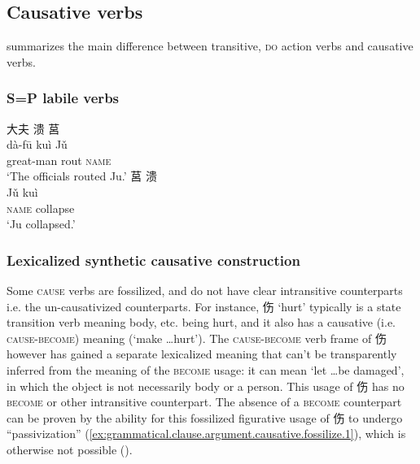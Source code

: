 \documentclass[UTF8, a4paper, oneside, scheme=plain, 12pt]{ctexrep}
\newcommand*{\citepage}[1]{p.~{#1}}
\newcommand{\translate}[1]{`#1'}
\newcommand*{\category}[1]{\textsc{#1}}
\begin{document}
\subsection{Causative verbs}

\citet[\citepage{272}]{meiguang2018} summarizes the main difference between transitive, \category{do} action verbs and causative verbs.

\subsubsection{S=P labile verbs}\label{sec:valency.monotransitive.s-p}

\begin{exe}
    \ex
    \glll 大夫 溃 莒 \\
    dà-fū kuì Jǔ \\
    great-man rout \category{name} \\
    \glt\translate{The officials routed Ju.}
    \ex
    \glll 莒 溃 \\
    Jǔ kuì \\
    \category{name} collapse \\
    \glt\translate{Ju collapsed.}
\end{exe}

\subsubsection{Lexicalized synthetic causative construction}
\label{sec:grammatical.clause.verbal.argument-structure.causative.fossilization}

Some \category{cause} verbs are fossilized,
and do not have clear intransitive counterparts
i.e. the un-causativized counterparts.
For instance, 伤 \translate{hurt} typically is a state transition verb meaning body, etc. being hurt,
and it also has a causative (i.e. \category{cause}-\category{become}) meaning
(\translate{make \dots hurt}).
The \category{cause}-\category{become} verb frame of 伤 however has gained a separate lexicalized meaning that can't be transparently inferred from the meaning of the \category{become} usage:
it can mean \translate{let \dots be damaged},
in which the object is not necessarily body or a person.
This usage of 伤 has no \category{become} or other intransitive counterpart.
The absence of a \category{become} counterpart can be proven by 
the ability for this fossilized figurative usage of 伤 to undergo ``passivization'' 
(\ref{ex:grammatical.clause.argument.causative.fossilize.1}),
which is otherwise not possible ().
\end{document}
